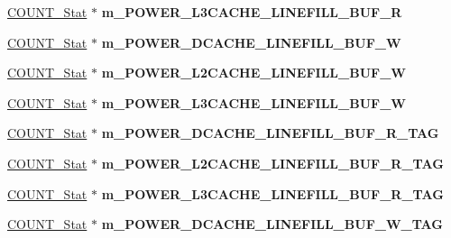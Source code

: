 \begin{DoxyCompactItemize}
\item 
\hypertarget{classall__stats__c_a3445ef7e02b3e36d0a72aed3d723fcec}{
\hyperlink{classCOUNT__Stat}{COUNT\_\-Stat} $\ast$ {\bfseries m\_\-POWER\_\-L3CACHE\_\-LINEFILL\_\-BUF\_\-R}}
\label{classall__stats__c_a3445ef7e02b3e36d0a72aed3d723fcec}

\item 
\hypertarget{classall__stats__c_a2b5f0b340eda52d0cccc3ab029d006a4}{
\hyperlink{classCOUNT__Stat}{COUNT\_\-Stat} $\ast$ {\bfseries m\_\-POWER\_\-DCACHE\_\-LINEFILL\_\-BUF\_\-W}}
\label{classall__stats__c_a2b5f0b340eda52d0cccc3ab029d006a4}

\item 
\hypertarget{classall__stats__c_aa6e5e768ffad79f26fde041a6662721b}{
\hyperlink{classCOUNT__Stat}{COUNT\_\-Stat} $\ast$ {\bfseries m\_\-POWER\_\-L2CACHE\_\-LINEFILL\_\-BUF\_\-W}}
\label{classall__stats__c_aa6e5e768ffad79f26fde041a6662721b}

\item 
\hypertarget{classall__stats__c_a247e57cead08b24a8252baec7d14099a}{
\hyperlink{classCOUNT__Stat}{COUNT\_\-Stat} $\ast$ {\bfseries m\_\-POWER\_\-L3CACHE\_\-LINEFILL\_\-BUF\_\-W}}
\label{classall__stats__c_a247e57cead08b24a8252baec7d14099a}

\item 
\hypertarget{classall__stats__c_a8888be27715b9b5db7616ca0b5aef90f}{
\hyperlink{classCOUNT__Stat}{COUNT\_\-Stat} $\ast$ {\bfseries m\_\-POWER\_\-DCACHE\_\-LINEFILL\_\-BUF\_\-R\_\-TAG}}
\label{classall__stats__c_a8888be27715b9b5db7616ca0b5aef90f}

\item 
\hypertarget{classall__stats__c_a035dfb256684a04209e6c82df6cfd18d}{
\hyperlink{classCOUNT__Stat}{COUNT\_\-Stat} $\ast$ {\bfseries m\_\-POWER\_\-L2CACHE\_\-LINEFILL\_\-BUF\_\-R\_\-TAG}}
\label{classall__stats__c_a035dfb256684a04209e6c82df6cfd18d}

\item 
\hypertarget{classall__stats__c_a3957561d9bca924d9bde32708746f722}{
\hyperlink{classCOUNT__Stat}{COUNT\_\-Stat} $\ast$ {\bfseries m\_\-POWER\_\-L3CACHE\_\-LINEFILL\_\-BUF\_\-R\_\-TAG}}
\label{classall__stats__c_a3957561d9bca924d9bde32708746f722}

\item 
\hypertarget{classall__stats__c_ad85866548bf00fef6150b909424c980e}{
\hyperlink{classCOUNT__Stat}{COUNT\_\-Stat} $\ast$ {\bfseries m\_\-POWER\_\-DCACHE\_\-LINEFILL\_\-BUF\_\-W\_\-TAG}}
\label{classall__stats__c_ad85866548bf00fef6150b909424c980e}


\end{DoxyCompactItemize}

